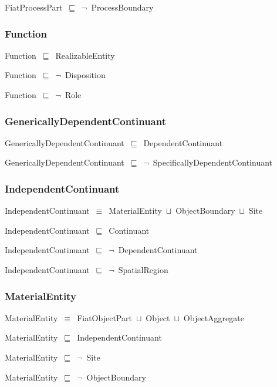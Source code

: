 \documentclass{article}
\begin{document}
FiatProcessPart~\ensuremath{\sqsubseteq}~\ensuremath{\lnot}~ProcessBoundary

\subsubsection*{Function}

Function~\ensuremath{\sqsubseteq}~RealizableEntity~

Function~\ensuremath{\sqsubseteq}~\ensuremath{\lnot}~Disposition

Function~\ensuremath{\sqsubseteq}~\ensuremath{\lnot}~Role

\subsubsection*{GenericallyDependentContinuant}

GenericallyDependentContinuant~\ensuremath{\sqsubseteq}~DependentContinuant~

GenericallyDependentContinuant~\ensuremath{\sqsubseteq}~\ensuremath{\lnot}~SpecificallyDependentContinuant

\subsubsection*{IndependentContinuant}

IndependentContinuant~\ensuremath{\equiv}~MaterialEntity~\ensuremath{\sqcup}~ObjectBoundary~\ensuremath{\sqcup}~Site

IndependentContinuant~\ensuremath{\sqsubseteq}~Continuant~

IndependentContinuant~\ensuremath{\sqsubseteq}~\ensuremath{\lnot}~DependentContinuant

IndependentContinuant~\ensuremath{\sqsubseteq}~\ensuremath{\lnot}~SpatialRegion

\subsubsection*{MaterialEntity}

MaterialEntity~\ensuremath{\equiv}~FiatObjectPart~\ensuremath{\sqcup}~Object~\ensuremath{\sqcup}~ObjectAggregate

MaterialEntity~\ensuremath{\sqsubseteq}~IndependentContinuant~

MaterialEntity~\ensuremath{\sqsubseteq}~\ensuremath{\lnot}~Site

MaterialEntity~\ensuremath{\sqsubseteq}~\ensuremath{\lnot}~ObjectBoundary
\end{document}
